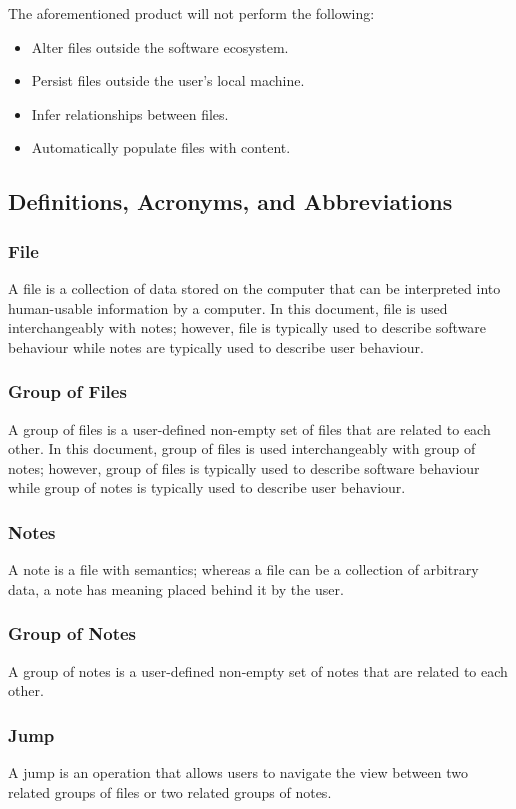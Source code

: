 \documentclass{article}
\begin{document}
The aforementioned product will not perform the following:

\begin{itemize}
\item Alter files outside the software ecosystem.
\item Persist files outside the user's local machine.
\item Infer relationships between files.
\item Automatically populate files with content.
\end{itemize}

\subsection{Definitions, Acronyms, and Abbreviations}
\subsubsection{File}
A file is a collection of data stored on the computer that can be interpreted into human-usable information by a computer. In this document, file is used interchangeably with notes; however, file is typically used to describe software behaviour while notes are typically used to describe user behaviour.

\subsubsection{Group of Files}
A group of files is a user-defined non-empty set of files that are related to each other. In this document, group of files is used interchangeably with group of notes; however, group of files is typically used to describe software behaviour while group of notes is typically used to describe user behaviour.

\subsubsection{Notes}
A note is a file with semantics; whereas a file can be a collection of arbitrary data, a note has meaning placed behind it by the user.

\subsubsection{Group of Notes}
A group of notes is a user-defined non-empty set of notes that are related to each other.

\subsubsection{Jump}
A jump is an operation that allows users to navigate the view between two related groups of files or two related groups of notes.
\end{document}
